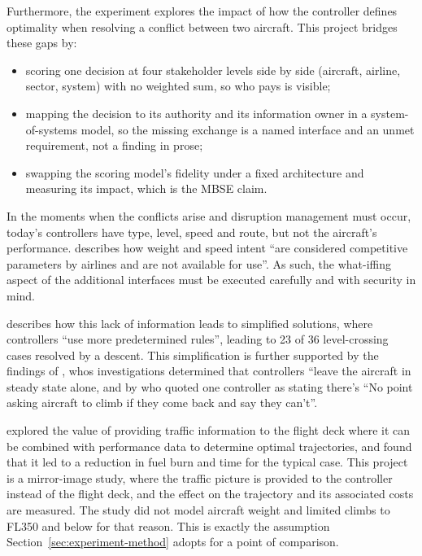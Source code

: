 Furthermore, the experiment explores the impact of how the controller defines optimality when resolving a conflict between two aircraft. This project bridges these gaps by: 
\begin{itemize}
    \item scoring one decision at four stakeholder levels side by side (aircraft, airline, sector, system) with no weighted sum, so who pays is visible;
    \item mapping the decision to its authority and its information owner in a system-of-systems model, so the missing exchange is a named interface and an unmet requirement, not a finding in prose;
    \item swapping the scoring model's fidelity under a fixed architecture and measuring its impact, which is the MBSE claim.
\end{itemize}

In the moments when the conflicts arise and disruption management must occur, today's controllers have type, level, speed and route, but not the aircraft's performance. \cite{schultz2012adaptiveClimb} describes how weight and speed intent ``are considered competitive parameters by airlines and are not available for use''. As such, the what-iffing aspect of the additional interfaces must be executed carefully and with security in mind.

\cite{rantanen2012conflictManeuvers} describes how this lack of information leads to simplified solutions, where controllers ``use more predetermined rules'', leading to 23 of 36 level-crossing cases resolved by a descent. This simplification is further supported by the findings of \cite{kirwan2001coraStrategies}, whos investigations determined that controllers ``leave the aircraft in steady state alone,  and by \cite{fothergill2013resolutionHeuristics} who quoted one controller as stating there's ``No point asking aircraft to climb if they come back and say they can't''. 

\cite{engility2014tasarAlaska} explored the value of providing traffic information to the flight deck where it can be combined with performance data to determine optimal trajectories, and found that it led to a reduction in fuel burn and time for the typical case. This project is a mirror-image study, where the traffic picture is provided to the controller instead of the flight deck, and the effect on the trajectory and its associated costs are measured. The study did not model aircraft weight and limited climbs to FL350 and below for that reason. This is exactly the assumption Section~\ref{sec:experiment-method} adopts for a point of comparison.


